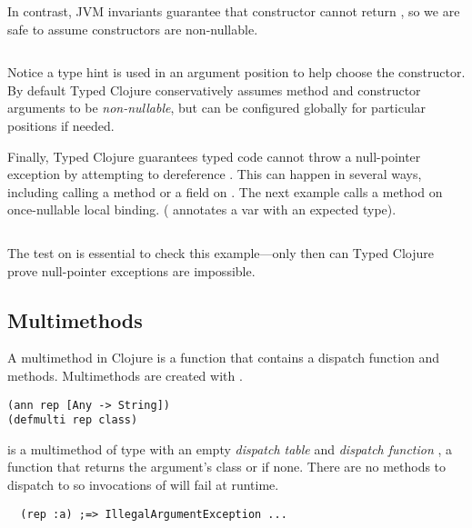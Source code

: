 \begin{exmp}
\inputminted[firstline=12,lastline=13]{clojure}{code/demo/src/demo/parent3.clj}
\end{exmp}

In contrast, JVM invariants guarantee that  constructor cannot return ,
so we are safe to assume constructors are non-nullable.

\begin{Code}
\begin{exmp}
\inputminted[firstline=15,lastline=16]{clojure}{code/demo/src/demo/parent3.clj}
\end{exmp}
\end{Code}

Notice a type hint is used in an argument position to help choose the 
constructor. By default Typed Clojure conservatively assumes method and constructor arguments to be \emph{non-nullable},
but can be configured globally for particular positions if needed.

Finally, Typed Clojure guarantees typed code cannot throw a null-pointer exception
by attempting to dereference . This can happen in several ways, including
calling a method or a field on .
The next example calls a method on once-nullable local binding.
( annotates a var with an expected type).

\begin{exmp}
\inputminted[firstline=5,lastline=8]{clojure}{code/demo/src/demo/parent3.clj}
\end{exmp}

The test on  is essential to check this example---only then can Typed Clojure
prove null-pointer exceptions are impossible.

\subsection{Multimethods}

A multimethod in Clojure is a function that contains a dispatch
function and methods. Multimethods are created with {}.
\begin{verbatim}
(ann rep [Any -> String])
(defmulti rep class)
\end{verbatim}
 is a multimethod of type  with an empty \emph{dispatch table}
and \emph{dispatch function} , a function that returns the argument's class or  if none.
There are no methods to dispatch to so invocations of  will fail at runtime.
\begin{verbatim}
  (rep :a) ;=> IllegalArgumentException ...
\end{verbatim}

